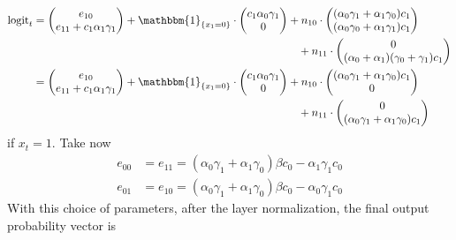 \begin{align}
\logit_t &= \begin{pmatrix}
    e_{10} \\
    e_{11} + c_1 \alpha_1 \gamma_1
    \end{pmatrix} +
    \mathbbm{1}_{\{x_1 = 0\}} \cdot \begin{pmatrix}
    c_1 \alpha_0 \gamma_1 \\
    0
    \end{pmatrix} +
    n_{10} \cdot \begin{pmatrix}
    (\alpha_0 \gamma_1 + \alpha_1 \gamma_0) c_1 \\
    (\alpha_0 \gamma_0 + \alpha_1 \gamma_1) c_1
    \end{pmatrix} \notag\\
    &\hspace{24em}+ n_{11} \cdot \begin{pmatrix}
    0 \\
    (\alpha_0 + \alpha_1)(\gamma_0 + \gamma_1) c_1
    \end{pmatrix} \\
    &= \begin{pmatrix}
    e_{10} \\
    e_{11} + c_1 \alpha_1 \gamma_1
    \end{pmatrix} +
    \mathbbm{1}_{\{x_1 = 0\}} \cdot \begin{pmatrix}
    c_1 \alpha_0 \gamma_1 \\
    0
    \end{pmatrix} +
    n_{10} \cdot \begin{pmatrix}
    (\alpha_0 \gamma_1 + \alpha_1 \gamma_0) c_1 \\
    0
    \end{pmatrix} \notag\\
    &\hspace{24em}+ n_{11} \cdot \begin{pmatrix}
    0 \\
    (\alpha_0 \gamma_1 + \alpha_1 \gamma_0) c_1
    \end{pmatrix}
\end{align}
if $x_t = 1$.
Take now
\begin{align}
e_{00} &= e_{11} = (\alpha_0 \gamma_1 + \alpha_1 \gamma_0) \beta c_0 - \alpha_1\gamma_1 c_0 \\
e_{01} &= e_{10} = (\alpha_0 \gamma_1 + \alpha_1 \gamma_0) \beta c_0 - \alpha_0\gamma_1 c_0
\end{align}
With this choice of parameters, after the layer normalization, the final output probability vector is
